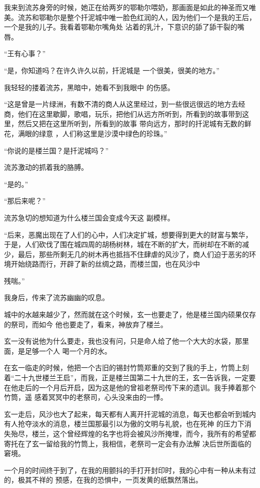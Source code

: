 \documentclass{article}
\begin{document}
我来到流苏身旁的时候，她正在给两岁的鄂勒尔喂奶，那画面是如此的神圣而又唯美。流苏和鄂勒尔是整个扦泥城中唯一脸色红润的人，因为他们一个是我的王后，一个是我的儿子。我看着鄂勒尔嘴角处
沾着的乳汁，下意识的舔了舔干裂的嘴唇。 


“王有心事？” 

“是，你知道吗？在许久许久以前，扦泥城是
一个很美，很美的地方。” 

我轻轻的搂着流苏，黑暗中，她看不到我眼中
的伤感。 

“这是曾是一片绿洲，有数不清的商人从这里经过，到一些很远很远的地方去经商，他们在这里歇脚，歌唱，玩乐，把他们从远方所听到，所看到的故事带到这里，然后又把在这里所听到，所看到的故事
\newpage
带向远方，那时的扦泥城有无数的鲜花，满眼的绿意
，人们称这里是沙漠中绿色的珍珠。” 


“你说的是楼兰国？是扦泥城吗？” 


流苏激动的抓着我的胳膊。 


“是的。” 


“那后来呢？” 

流苏急切的想知道为什么楼兰国会变成今天这
副模样。 

“后来，恶魔出现在了人们的心中，人们决定扩城，想要得到更大的财富与繁华，于是，人们砍伐了围在城四周的胡杨树林，城在不断的扩大，而树却在不断的减少，最后，那些所剩无几的树木再也抵挡不住肆虐的风沙了，商人们迫于恶劣的环境开始绕路而行，开辟了新的丝绸之路，而楼兰国，也在风沙中

\newpage
残喘。” 


我身后，传来了流苏幽幽的叹息。 

城中的水越来越少了，然而就在这个时候，玄一也要走了，他是楼兰国内硕果仅存的祭司，而如今
他也要走了，看来，神放弃了楼兰。 

玄一没有说他为什么要走，我也没有问，只是命人给了他一个大大的水袋，那里面，是足够一个人
喝一个月的水。 

在玄一临走的时候，他把一个古旧的锡封竹筒郑重的交到了我的手上，竹筒上刻着“二十九世楼兰王启”，而我，正是楼兰国第二十九世的王，玄一告诉我，一定要在他走后的一个月后开启，因为这是他的曾祖老祭司传下来的遗训。我手捧着那个竹筒，遥
感着冥冥中的老祭司，心头没来由的一悸。 

玄一走后，风沙也大了起来，每天都有人离开扦泥城的消息，每天也都会听到城内有人抢夺淡水的消息，楼兰国那最引以为傲的文明与礼貌，也在死神
\newpage
的压力下消失殆尽，楼兰，这个曾经辉煌的名字也将会被风沙所掩埋，而今，我所有的希望都寄托在了玄一留给我的竹筒上，我相信，老祭司一定会有办法解
决后世所面临的窘境。 

一个月的时间终于到了，在我的用颤抖的手打开封印时，我的心中有一种从未有过的，极其不祥的
预感，在我的恐惧中，一页发黄的纸飘然落出。 
\end{document}
